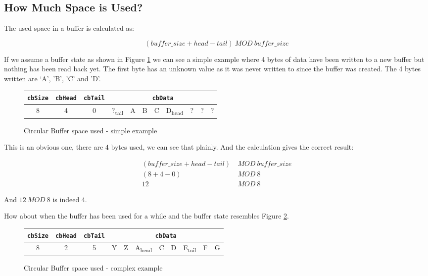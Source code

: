 \subsection{How Much Space is Used?}

The used space in a buffer is calculated as:

\[
\left(buffer\_size+head-tail\right)\ MOD\ buffer\_size
\]

If we assume a buffer state as shown in Figure \ref{fig:Circular-Buffer-space-used-simple-example}
we can see a simple example where 4 bytes of data have been written
to a new buffer but nothing has been read back yet. The first byte
has an unknown value as it was never written to since the buffer was
created. The 4 bytes written are `A', 'B', 'C' and 'D'.

\begin{figure}[!h]
\begin{centering}
\begin{tabular}{|c|c|c||c|c|c|c|c|c|c|c|}
\hline 
\texttt{\textbf{cbSize}} & \texttt{\textbf{cbHead}} & \texttt{\textbf{cbTail}} & \multicolumn{8}{c|}{\texttt{\textbf{cbData}}}\tabularnewline
\hline 
\hline 
8 & 4 & 0 & ?\textsubscript{tail} & A & B & C & D\textsubscript{head} & ? & ? & ?\tabularnewline
\hline 
\end{tabular}
\par\end{centering}
\centering{}\caption{Circular Buffer space used - simple example \label{fig:Circular-Buffer-space-used-simple-example}}
\end{figure}

This is an obvious one, there are 4 bytes used, we can see that plainly.
And the calculation gives the correct result:

\begin{align*}
\left(buffer\_size+head-tail\right) & \ MOD\ buffer\_size\\
\left(8+4-0\right) & \ MOD\ 8\\
12 & \ MOD\ 8
\end{align*}

And $12\ MOD\ 8$ is indeed 4.

How about when the buffer has been used for a while and the buffer
state resembles Figure \ref{fig:Circular-Buffer-space-used-comples-example}.

\begin{figure}[!h]
\begin{centering}
\begin{tabular}{|c|c|c||c|c|c|c|c|c|c|c|}
\hline 
\texttt{\textbf{cbSize}} & \texttt{\textbf{cbHead}} & \texttt{\textbf{cbTail}} & \multicolumn{8}{c|}{\texttt{\textbf{cbData}}}\tabularnewline
\hline 
\hline 
8 & 2 & 5 & Y & Z & A\textsubscript{head} & C & D & E\textsubscript{tail} & F & G\tabularnewline
\hline 
\end{tabular}
\par\end{centering}
\centering{}\caption{Circular Buffer space used - complex example \label{fig:Circular-Buffer-space-used-comples-example}}
\end{figure}

